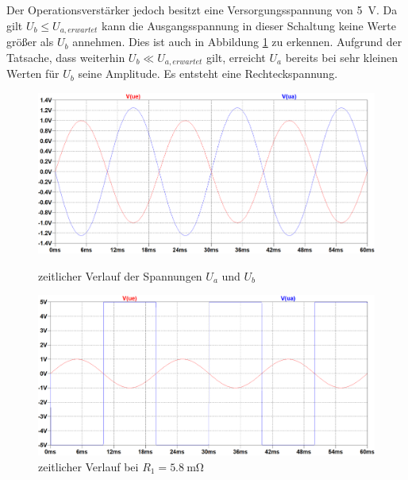 \documentclass[
	journal,
	a4paper,
]{IEEEtran}
\newcommand{\bildbreite}{0.95\columnwidth}
\begin{document}
	 Der Operationsverstärker jedoch besitzt eine Versorgungsspannung von \SI{5}{\volt}. Da gilt \(U_b\le U_{a,erwartet}\) kann die Ausgangsspannung in dieser Schaltung keine Werte größer als \(U_b\) annehmen. Dies ist auch in Abbildung \ref{fig:2d:Kurven} zu erkennen. Aufgrund der Tatsache, dass weiterhin
	 \(U_b\ll U_{a,erwartet}\) 
gilt, erreicht \(U_a\) bereits bei sehr kleinen Werten für \(U_b\) seine Amplitude. Es entsteht eine Rechteckspannung.

	
	\begin{figure}[t]
		\centering
		\includegraphics[width=\bildbreite]{2cKurven.png}
		\caption{zeitlicher Verlauf der Spannungen \(U_a\) und \(U_b\)}
		\label{fig:2c:Kurven}
		
		\includegraphics[width=\bildbreite]{2dKurven.png}
		\caption{zeitlicher Verlauf bei \(R_1=\SI{5.8}{\milli\ohm}\)}
		\label{fig:2d:Kurven}
	\end{figure}



\end{document}
